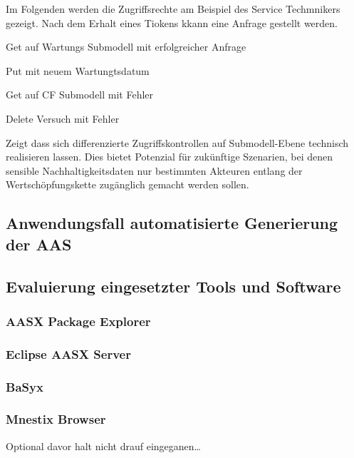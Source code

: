 Im Folgenden werden die Zugriffsrechte am Beispiel des Service Techmnikers gezeigt.
Nach dem Erhalt eines Tiokens kkann eine Anfrage gestellt werden.

Get auf Wartungs Submodell mit erfolgreicher Anfrage 

Put mit neuem Wartungtsdatum

Get auf CF Submodell mit Fehler

Delete Versuch mit Fehler


Zeigt dass sich differenzierte Zugriffskontrollen auf Submodell-Ebene technisch realisieren lassen. 
Dies bietet Potenzial für zukünftige Szenarien, bei denen sensible Nachhaltigkeitsdaten nur bestimmten Akteuren entlang der Wertschöpfungskette zugänglich gemacht werden sollen.

\subsection{Anwendungsfall automatisierte Generierung der AAS}

\subsection{Evaluierung eingesetzter Tools und Software}
\subsubsection{AASX Package Explorer}
\subsubsection{Eclipse AASX Server}
\subsubsection{BaSyx}
\subsubsection{Mnestix Browser}
Optional davor halt nicht drauf eingeganen\dots
